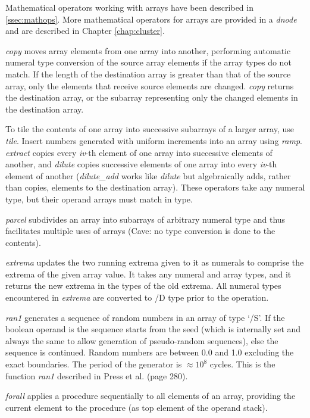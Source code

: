  Mathematical operators working with arrays have been described in \ref{ssec:mathops}. More mathematical operators for arrays are provided in a \emph{dnode} and are described in Chapter \ref{chap:cluster}.

\emph{copy} moves  array elements from one array into another, performing automatic numeral  type conversion of the source array elements if the array types do not match. If the length of the destination array is greater than that of the source array, only the elements that receive source elements are changed. \emph{copy} returns the destination array, or the subarray representing only the changed elements in the destination array.

To tile the contents of one array into successive subarrays of a larger array, use \emph{tile}. Insert numbers generated with uniform increments into an array using \emph{ramp}. \emph{extract} copies every \emph{iv}-th element of one array into successive elements of another, and \emph{dilute} copies successive elements of one array into every \emph{iv}-th element of another (\emph{dilute\_add} works like \emph{dilute} but algebraically adds, rather than copies, elements to the destination array). These operators take any numeral type, but their operand arrays must match in type.

\emph{parcel} subdivides an array into subarrays of arbitrary  numeral  type  and thus facilitates multiple  uses  of  arrays (Cave: no type conversion is done to the contents).

\emph{extrema} updates the two running extrema given to it as numerals to comprise the extrema of the given array value. It takes any numeral and array types, and it returns the new extrema in the types of the old extrema. All numeral types encountered in \emph{extrema} are converted to /D type prior to the operation.

\emph{ran1} generates a sequence of random numbers in an array of type
`/S'. If the boolean operand is  the sequence starts from the
seed (which is internally set and always the same to allow generation
of pseudo-random sequences), else the sequence is continued. Random
numbers are between 0.0 and 1.0 excluding the exact boundaries. The
period of the generator is $\approx 10^8$ cycles. This is the function
\emph{ran1} described in Press et al. (page 280).

\emph{forall} applies a procedure sequentially to all elements of an array, providing the current element to the procedure (as top element of the operand stack).


